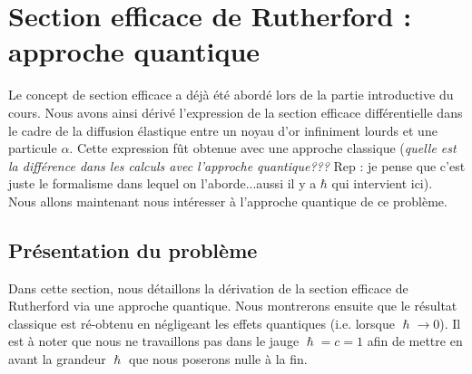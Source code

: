 \section{Section efficace de Rutherford : approche quantique}

Le concept de section efficace a déjà été abordé lors de la partie introductive du cours. Nous avons ainsi dérivé l'expression de la section efficace différentielle dans le cadre de la diffusion élastique entre un noyau d'or infiniment lourds et une particule $\alpha$. Cette expression fût obtenue avec une approche classique (\textit{quelle est la différence dans les calculs avec l'approche quantique???} Rep : je pense que c'est juste le formalisme dans lequel on l'aborde...aussi il y a $\hbar$ qui intervient ici).\\
Nous allons maintenant nous intéresser à l'approche quantique de ce problème.

\subsection{Présentation du problème}

Dans cette section, nous détaillons la dérivation de la section efficace de Rutherford via une approche quantique. Nous montrerons ensuite que le résultat classique est ré-obtenu en négligeant les effets quantiques (i.e. lorsque $\hslash \rightarrow 0$). Il est à noter que nous ne travaillons pas dans le jauge $\hslash = c = 1$ afin de mettre en avant la grandeur $\hslash$ que nous poserons nulle à la fin.\\

